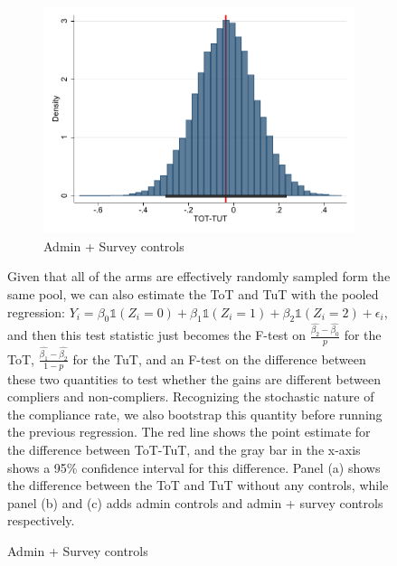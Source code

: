 \begin{figure}[H]
\begin{center}
\begin{subfigure}{0.31\textwidth}
        \caption{Admin + Survey controls}
        \centering
        \includegraphics[width=\textwidth]{Figuras/tot_tut_btsp3.pdf}
    \end{subfigure}
  
    \end{center}
     \scriptsize  Given that all of the arms are effectively randomly sampled form the same pool, we can also estimate the ToT and TuT with the pooled regression: $Y_i = \beta_0\mathds{1}(Z_i=0)+\beta_1\mathds{1}(Z_i=1)+\beta_2\mathds{1}(Z_i=2)+ \epsilon_i$, and then this test statistic just becomes the F-test on $\frac{\widehat{\beta_2}-\widehat{\beta_0}}{p}$ for the ToT, $\frac{\widehat{\beta_1}-\widehat{\beta_2}}{1-p}$ for the TuT, and an F-test on the difference between these two quantities to test whether the gains are different between compliers and non-compliers. Recognizing the stochastic nature of the compliance rate, we also bootstrap this quantity before running the previous regression. The red line shows the point estimate for the difference between ToT-TuT, and the gray bar in the x-axis shows a 95\% confidence interval for this difference. Panel (a) shows the difference between the ToT and TuT without any controls, while panel (b) and (c) adds admin controls and admin + survey controls respectively.
\end{figure}


